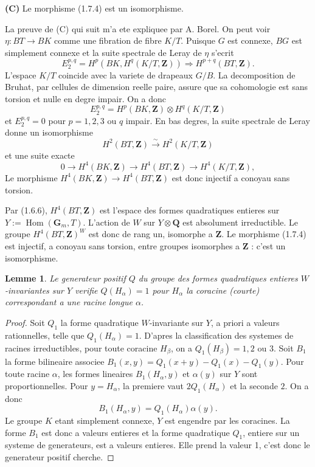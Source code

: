 \documentclass[11pt,a4paper]{article}
\theoremstyle{plain}
\newtheorem{lemma}[theorem]{Lemme}
\theoremstyle{definition}
\DeclareMathOperator{\Hom}{Hom}
\begin{document}
\textbf{(C)} Le morphisme (1.7.4) est un isomorphisme.

La preuve de (C) qui suit m'a ete expliquee par A. Borel. On peut voir $\eta : BT \to BK$ comme une fibration de fibre $K/T$. Puisque $G$ est connexe, $BG$ est simplement connexe et la suite spectrale de Leray de $\eta$ s'ecrit
\[
E_2^{p,q} = H^p(BK, H^q(K/T, \mathbf{Z})) \Rightarrow H^{p+q}(BT, \mathbf{Z}).
\]
L'espace $K/T$ coincide avec la variete de drapeaux $G/B$. La decomposition de Bruhat, par cellules de dimension reelle paire, assure que sa cohomologie est sans torsion et nulle en degre impair. On a donc
\[
E_2^{p,q} = H^p(BK, \mathbf{Z}) \otimes H^q(K/T, \mathbf{Z})
\]
et $E_2^{p,q} = 0$ pour $p = 1, 2, 3$ ou $q$ impair. En bas degres, la suite spectrale de Leray donne un isomorphisme
\[
H^2(BT, \mathbf{Z}) \xrightarrow{\sim} H^2(K/T, \mathbf{Z})
\]
et une suite exacte
\[
0 \to H^4(BK, \mathbf{Z}) \to H^4(BT, \mathbf{Z}) \to H^4(K/T, \mathbf{Z}),
\]
Le morphisme $H^4(BK, \mathbf{Z}) \to H^4(BT, \mathbf{Z})$ est donc injectif a conoyau sans torsion.

Par (1.6.6), $H^4(BT, \mathbf{Z})$ est l'espace des formes quadratiques entieres sur $Y := \Hom(\mathbf{G}_m, T)$. L'action de $W$ sur $Y \otimes \mathbf{Q}$ est absolument irreductible. Le groupe $H^4(BT, \mathbf{Z})^W$ est donc de rang un, isomorphe a $\mathbf{Z}$. Le morphisme (1.7.4) est injectif, a conoyau sans torsion, entre groupes isomorphes a $\mathbf{Z}$ : c'est un isomorphisme.

\begin{lemma}\label{1.7.5}
Le generateur positif $Q$ du groupe des formes quadratiques entieres $W$-invariantes sur $Y$ verifie $Q(H_\alpha) = 1$ pour $H_\alpha$ la coracine (courte) correspondant a une racine longue $\alpha$.
\end{lemma}

\begin{proof}
Soit $Q_1$ la forme quadratique $W$-invariante sur $Y$, a priori a valeurs rationnelles, telle que $Q_1(H_\alpha) = 1$. D'apres la classification des systemes de racines irreductibles, pour toute coracine $H_\beta$, on a $Q_1(H_\beta) = 1, 2$ ou $3$. Soit $B_1$ la forme bilineaire associee $B_1(x,y) = Q_1(x+y) - Q_1(x) - Q_1(y)$. Pour toute racine $\alpha$, les formes lineaires $B_1(H_\alpha, y)$ et $\alpha(y)$ sur $Y$ sont proportionnelles. Pour $y = H_\alpha$, la premiere vaut $2Q_1(H_\alpha)$ et la seconde $2$. On a donc
\begin{equation}\label{1.7.6}
B_1(H_\alpha, y) = Q_1(H_\alpha) \alpha(y).
\end{equation}
Le groupe $K$ etant simplement connexe, $Y$ est engendre par les coracines. La forme $B_1$ est donc a valeurs entieres et la forme quadratique $Q_1$, entiere sur un systeme de generateurs, est a valeurs entieres. Elle prend la valeur 1, c'est donc le generateur positif cherche.
\end{proof}
\end{document}
